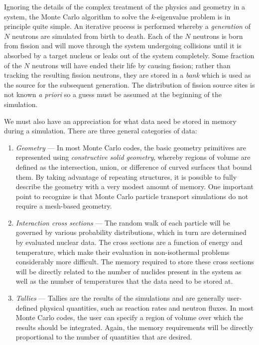 \documentclass[3p,fleqn]{elsarticle}
\begin{document}
Ignoring the details of the complex treatment of the physics and geometry in a
system, the Monte Carlo algorithm to solve the $k$-eigenvalue problem is in
principle quite simple. An iterative process is performed whereby a
\textit{generation} of $N$ neutrons are simulated from birth to death. Each of
the $N$ neutrons is born from fission and will move through the system
undergoing collisions until it is absorbed by a target nucleus or leaks out of
the system completely. Some fraction of the $N$ neutrons will have ended their
life by causing fission; rather than tracking the resulting fission neutrons,
they are stored in a \textit{bank} which is used as the source for the
subsequent generation. The distribution of fission source sites is not known
\textit{a priori} so a guess must be assumed at the beginning of the simulation.

We must also have an appreciation for what data need be stored in memory during
a simulation. There are three general categories of data:
\begin{enumerate}
  \item \textit{Geometry} --- In most Monte Carlo codes, the basic geometry
    primitives are represented using \textit{constructive solid geometry},
    whereby regions of volume are defined as the intersection, union, or
    difference of curved surfaces that bound them. By taking advantage of
    repeating structures, it is possible to fully describe the geometry with a
    very modest amount of memory. One important point to recognize is that Monte
    Carlo particle transport simulations do not require a mesh-based geometry.
  \item \textit{Interaction cross sections} --- The random walk of each particle
    will be governed by various probability distributions, which in turn are
    determined by evaluated nuclear data. The cross sections are a function of
    energy and temperature, which make their evaluation in non-isothermal
    problems considerably more difficult. The memory required to store these
    cross sections will be directly related to the number of nuclides present in
    the system as well as the number of temperatures that the data need to be
    stored at.
  \item \textit{Tallies} --- Tallies are the results of the simulations and are
    generally user-defined physical quantities, such as reaction rates and
    neutron fluxes. In most Monte Carlo codes, the user can specify a region of
    volume over which the results should be integrated. Again, the memory
    requirements will be directly proportional to the number of quantities that
    are desired.
\end{enumerate}
\end{document}
